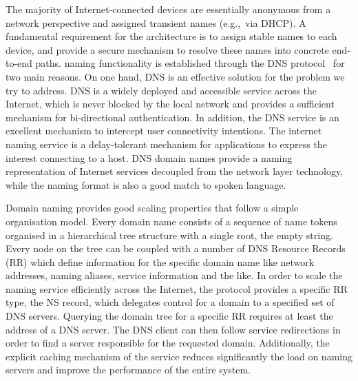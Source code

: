 The majority of Internet-connected devices are essentially anonymous from a
network perspective and assigned transient names (e.g.,~via DHCP). 
A fundamental
requirement for the \signpost architecture is to assign stable names to each
device, and provide a secure mechanism to resolve these names into concrete
end-to-end paths.  \signpost naming functionality is established through the
DNS protocol~\cite{RFC1034} for two main reasons. On one hand, DNS is an
effective solution for the problem we try to address. DNS is a widely deployed
and accessible service across the Internet, which is never blocked by the local
network and provides a sufficient mechanism for bi-directional authentication.
In addition, the DNS service is an excellent mechanism to intercept user
connectivity intentions. The internet naming service is a delay-tolerant mechanism for
applications to express the interest connecting to a host. DNS domain names
provide a naming representation of Internet services decoupled from the network
layer technology, while the naming format is also a good match to spoken language. 

Domain naming provides good scaling properties that follow a simple organisation
model.  Every domain name consists of a sequence of name tokens organised in a
hierarchical tree structure with a single root, the empty string. Every node on
the tree can be coupled with a number of DNS Resource Records (RR) which define
information for the specific domain name like network addresses, naming aliases,
service information and the like. In order to scale the naming service
efficiently across the Internet, the protocol provides a specific RR type, the
NS record, which delegates control for a domain to a specified set of DNS
servers. Querying the domain tree for a specific RR requires at least the
address of a DNS server. The DNS client can then follow service redirections in
order to find a server responsible for the requested domain.  Additionally, the
explicit caching mechanism of the service reduces significantly the load on
naming servers and improve the performance of the entire system.


